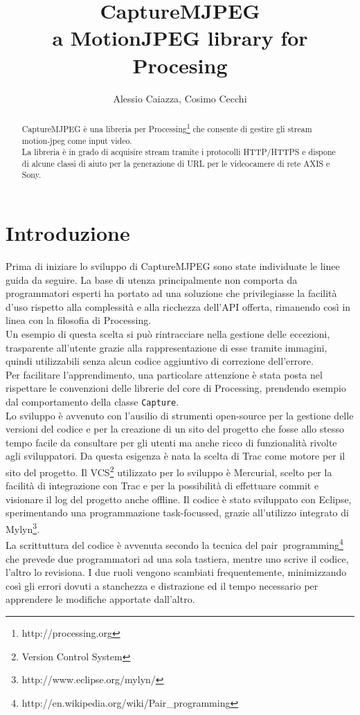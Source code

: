 \documentclass[a4paper,11pt]{article}
\author{Alessio Caiazza, Cosimo Cecchi}
\title{\textbf{CaptureMJPEG}\\ a MotionJPEG library for Procesing}
\begin{document}
\maketitle

\newcommand{\reffigura}[1]{
  Figura \ref{#1}
}

\begin{abstract}
CaptureMJPEG è una libreria per
Processing\footnote{http://processing.org} che consente di gestire gli
stream motion-jpeg come input video.\\
La libreria è in grado di acquisire stream tramite i protocolli
\mbox{HTTP/HTTPS} e dispone di alcune classi di aiuto per la 
generazione di URL per le videocamere di rete AXIS e Sony.  
\end{abstract}
\tableofcontents


\section{Introduzione}
\label{sec:introduzione}
Prima di iniziare lo sviluppo di CaptureMJPEG sono state individuate
le linee guida da seguire.
La base di utenza principalmente non comporta da programmatori esperti
ha portato ad una soluzione che privilegiasse la facilit\`a d'uso
rispetto alla complessit\`a e alla ricchezza dell'API offerta,
rimanendo così in linea con la filosofia di Processing.\\
Un esempio di questa scelta si pu\`o rintracciare nella gestione delle
eccezioni, trasparente all'utente grazie alla rappresentazione di esse
tramite immagini, quindi utilizzabili senza alcun codice aggiuntivo di
correzione dell'errore.\\
Per facilitare l'apprendimento, una particolare attenzione \`e stata
posta nel rispettare le convenzioni delle librerie del core di
Processing, prendendo esempio dal comportamento della classe
\texttt{Capture}.\\
Lo sviluppo è avvenuto con l'ausilio di strumenti open-source per la
gestione delle versioni del codice e per la creazione di un sito del 
progetto che fosse allo stesso tempo facile da consultare per gli utenti ma
anche ricco di funzionalit\`a rivolte agli sviluppatori. Da questa
esigenza \`e nata la scelta di Trac come motore per il sito del
progetto. Il VCS\footnote{Version Control System} utilizzato per lo
sviluppo \`e Mercurial, scelto per la facilit\`a di integrazione con 
Trac e per la possibilit\`a di effettuare commit e visionare il log
del progetto anche offline.
Il codice \`e stato sviluppato con Eclipse, sperimentando una 
programmazione task-focussed, grazie all'utilizzo integrato di
Mylyn\footnote{http://www.eclipse.org/mylyn/}.\\
La scrittuttura del codice è avvenuta secondo la tecnica del
pair~programming\footnote{http://en.wikipedia.org/wiki/Pair\_programming}
che prevede due programmatori ad una sola tastiera, mentre uno scrive
il codice, l'altro lo revisiona. I due ruoli vengono scambiati
frequentemente, minimizzando così gli errori dovuti a stanchezza e
distrazione ed il tempo necessario per apprendere le modifiche
apportate dall'altro.
\end{document}
